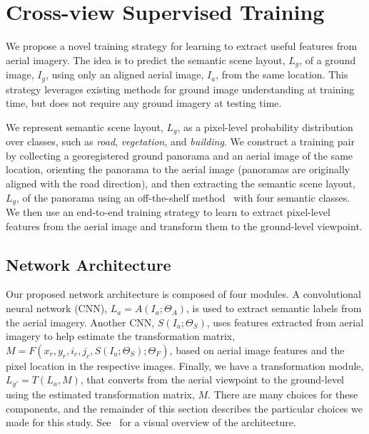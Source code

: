 \section{Cross-view Supervised Training}
\label{sec:method}

We propose a novel training strategy for learning to extract useful
features from aerial imagery.  The idea is to predict the semantic
scene layout, $L_g$, of a ground image, $I_g$, using only an aligned
aerial image, $I_a$, from the same location.  This strategy leverages
existing methods for ground image understanding at training time, but
does not require any ground imagery at testing time.  

We represent semantic scene layout, $L_g$, as a pixel-level
probability distribution over classes, such as {\em road}, {\em
vegetation}, and {\em building}.  We construct a training pair by
collecting a georegistered ground panorama and an aerial image of the
same location, orienting the panorama to the aerial image (panoramas
are originally aligned with the road direction), and then extracting
the semantic scene layout, $L_g$, of the panorama using an
off-the-shelf method~\cite{badrinarayanan2015segnet} with four
semantic classes.  We then use an end-to-end training strategy to
learn to extract pixel-level features from the aerial image and
transform them to the ground-level viewpoint.  

\subsection{Network Architecture}
\label{sec:architecture}  

Our proposed network architecture is composed of four modules. A
convolutional neural network (CNN), $L_a = A(I_a;\Theta_A)$, is used
to extract semantic labels from the aerial imagery. Another CNN,
$S(I_a;\Theta_S)$, uses features extracted from aerial imagery to help 
estimate the transformation matrix, $M = F(x_r, y_r, i_c, j_c,
S(I_a;\Theta_S); \Theta_F)$, based on aerial image features and the
pixel location in the respective images. Finally, we have a
transformation module, $L_{g'}= T(L_a,M)$, that converts from the
aerial viewpoint to the ground-level using the estimated
transformation matrix, $M$. 
There are many choices for these components, and the 
remainder of this section describes the particular choices we made for this 
study. See~ for a visual overview of the architecture.

